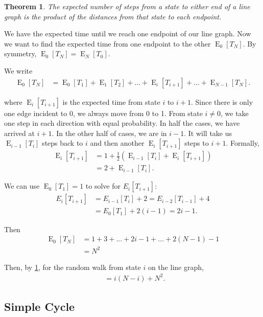 \documentclass[12pt]{article}
\newtheorem{theorem}{Theorem}
\theoremstyle{definition}
\DeclareMathOperator{\E}{\mathrm{E}}		     %
\DeclareMathOperator{\tcov}{t_\textrm{cov}}      %
\begin{document}
\begin{theorem}
The expected number of steps from a state to either end of a line graph
is the product of the distances from that state to each endpoint.
\label{thm:line}
\end{theorem}

We have the expected time until we reach one endpoint of our line graph.
Now we want to find the expected time from one endpoint to the other $\E_0[T_N]$.
By symmetry, $\E_0[T_N] = \E_N[T_0]$.

We write
\begin{align}
\E_0[T_N] &= \E_0[T_1] + \E_1[T_2] + ... + \E_{i}[T_{i+1}] + ... + \E_{N-1}[T_N]. \nonumber
\end{align}

where $\E_{i}[T_{i+1}]$ is the expected time from state $i$ to $i+1$.
Since there is only one edge incident to 0, we always move from 0 to 1.
From state $i\neq0$, we take one step in each direction with equal probability.
In half the cases, we have arrived at $i+1$.
In the other half of cases, we are in $i-1$.
It will take us $\E_{i-1}[T_i]$ steps back to $i$ and then another
$\E_i[T_{i+1}]$ steps to $i+1$.
Formally,
\begin{align}
\E_{i}[T_{i+1}] &= 1 + \frac{1}{2}(\E_{i-1}[T_i]+\E_i[T_{i+1}]) \nonumber \\
 &= 2 + \E_{i-1}[T_{i}]. \nonumber
\end{align}

We can use $\E_0[T_1] = 1$ to solve for $E_i[T_{i+1}]$:
\begin{align}
E_i[T_{i+1}] &= E_{i-1}[T_{i}] + 2 = E_{i-2}[T_{i-1}] + 4 \nonumber\\
 &= E_0[T_1] + 2(i-1) = 2i - 1. \nonumber
\end{align}

Then
\begin{align}
\E_0[T_N] &= 1 + 3 + ... + 2i - 1 + ... + 2(N-1) -1 \nonumber \\
&= N^2 \nonumber
\end{align}

Then, by \cref{thm:line}, for the random walk from state $i$ on the line graph,
\begin{align}
\tcov = i(N-i) + N^2. \nonumber
\end{align}

\subsection{Simple Cycle}
\end{document}
